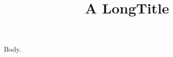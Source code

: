 \documentclass[pmlr]{jmlr}
\title[Short]{A Long\titlebreak Title \titletag{x}}
\author{\Name{A B}}
\begin{document}
\maketitle
Body.
\end{document}
